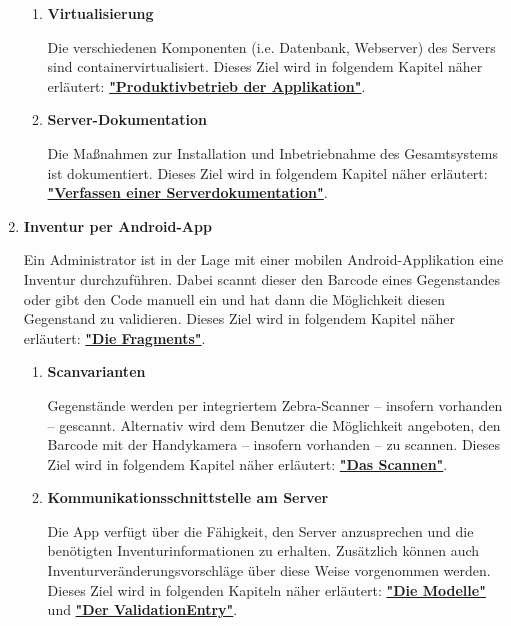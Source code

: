 \documentclass[
    headings=optiontotocandhead,%
    twoside,
    numbers=noenddot,%
    toc=flat, %
    12pt, %
    titlepage, %
    parskip=full, %
    listof=totoc, %
    listof=flat, %
    numbers=noenddot, %
    bibliography=totoc, %
    a4paper,DIV=14,
    BCOR=15mm,
]{scrbook}
\begin{document}
\begin{enumerate}
\begin{enumerate}
      \item	\textbf{Virtualisierung}

      Die verschiedenen Komponenten (i.e. Datenbank, Webserver) des Servers sind containervirtualisiert.  
      Dieses Ziel wird in folgendem Kapitel näher erläutert: \textbf{\hyperref[produktivbetrieb-der-applikation]{"Produktivbetrieb der Applikation"}}.

      \item	\textbf{Server-Dokumentation}

      Die Maßnahmen zur Installation und Inbetriebnahme des Gesamtsystems ist dokumentiert.
      Dieses Ziel wird in folgendem Kapitel näher erläutert: \textbf{\hyperref[verfassen-einer-serverdokumentation]{"Verfassen einer Serverdokumentation"}}.
    \end{enumerate}







      \item \textbf{Inventur per Android-App}

      Ein Administrator ist in der Lage mit einer mobilen Android-Applikation eine Inventur durchzuführen. Dabei scannt dieser den Barcode eines Gegenstandes oder gibt den Code manuell ein und hat dann die Möglichkeit diesen Gegenstand zu validieren. 
      Dieses Ziel wird in folgendem Kapitel näher erläutert: \textbf{\hyperref[die-fragments]{"Die Fragments"}}.
      
      \begin{enumerate}
        \item	\textbf{Scanvarianten}

        Gegenstände werden per integriertem Zebra-Scanner – insofern vorhanden – gescannt. Alternativ wird dem Benutzer die Möglichkeit angeboten, den Barcode mit der Handykamera – insofern vorhanden – zu scannen. 
        Dieses Ziel wird in folgendem Kapitel näher erläutert: \textbf{\hyperref[das_scannen]{"Das Scannen"}}.
      
        \item	\textbf{Kommunikationsschnittstelle am Server}

        Die App verfügt über die Fähigkeit, den Server anzusprechen und die benötigten Inventurinformationen zu erhalten. Zusätzlich können auch Inventurveränderungsvorschläge über diese Weise vorgenommen werden.
        Dieses Ziel wird in folgenden Kapiteln näher erläutert: \textbf{\hyperref[die-modelle]{"Die Modelle"}} und \textbf{\hyperref[der-validationentry]{"Der ValidationEntry"}}.
        

\end{enumerate}
\end{enumerate}
\end{document}
